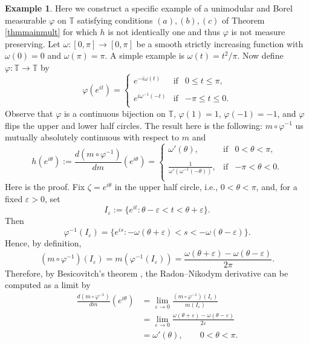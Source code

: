 \documentclass{dis}
\theoremstyle{plain}
\theoremstyle{definition}
\newtheorem{Example}[equation]{Example}
\def\T{\mathbb{T}}
\renewcommand{\leq}{\leqslant}
\renewcommand{\phi}{\varphi}
\newcommand{\0}{{\color{lightgray}0}}
\begin{document}
\begin{Example}
Here we construct a specific example of a unimodular and Borel measurable $\phi$ on $\T$ satisfying conditions $(a), (b), (c)$ of Theorem \ref{thmmainmult} for which $h$ is not identically one and thus $\phi$ is not measure preserving. Let $\omega:[0,\pi] \to [0,\pi]$ be a smooth strictly increasing function with $\omega(0)=0$ and $\omega(\pi)=\pi$. A simple example is $\omega(t) = t^2/\pi$. Now define $\varphi: \mathbb{T} \to \mathbb{T}$ by
\[
\varphi(e^{it}) = \left\{
\begin{array}{ccc}
e^{-i\omega(t)} & \mbox{if} & 0 \leq t \leq \pi,\\
%
& & \\
%
e^{i\omega^{-1}(-t)} & \mbox{if} & -\pi \leq t \leq 0.\\
\end{array} \right.
\]
Observe that $\varphi$ is a continuous bijection on $\mathbb{T}$,  $\varphi(1)=1$, $\varphi(-1)=-1$, and $\varphi$ flips the upper and lower half circles. The result here is the following: $m \circ \varphi^{-1}$ us mutually absolutely continuous with respect to $m$ and
\[
h(e^{i\theta}) := \frac{d (m \circ \varphi^{-1})}{dm}(e^{i\theta}) = 
\left\{
\begin{array}{ccc}
\omega'(\theta), & \mbox{if} & 0 < \theta < \pi,\\
%
& & \\
%
{\displaystyle \frac{1}{\omega'(\omega^{-1}(-\theta))}}, & \mbox{if} & -\pi < \theta < 0.\\
\end{array} \right.
\]
Here is the proof. 
Fix $\zeta = e^{i\theta}$ in the upper half circle, i.e., $0<\theta<\pi$, and, for a fixed $\varepsilon > 0$, set
\[
I_\varepsilon := \{ e^{it} : \theta-\varepsilon < t < \theta+\varepsilon \}.
\]
Then 
\[
\varphi^{-1}(I_\varepsilon) = \{ e^{is} : -\omega(\theta+\varepsilon) < s < -\omega(\theta-\varepsilon) \}.
\]
Hence, by definition,
\[
(m \circ \varphi^{-1})(I_\varepsilon) = m(\varphi^{-1}(I_\varepsilon)) = \frac{\omega(\theta+\varepsilon)-\omega(\theta-\varepsilon)}{2\pi}.
\]
Therefore, by Besicovitch's theorem \cite{MR14414}, the Radon--Nikodym derivative can be computed as a limit by 
\begin{align*}
\frac{d(m \circ \varphi^{-1})}{dm}(e^{i\theta}) &= \lim_{\varepsilon \to 0} \frac{(m \circ \varphi^{-1})(I_\varepsilon) }{m(I_\varepsilon)}\\
&= \lim_{\varepsilon \to 0} \frac{\omega(\theta+\varepsilon)-\omega(\theta-\varepsilon)}{2\varepsilon}\\
&= \omega'(\theta), \qquad 0 < \theta < \pi.
\end{align*}


\end{Example}
\end{document}
